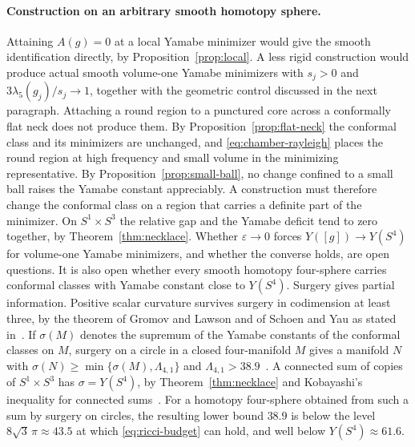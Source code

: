 \documentclass[11pt]{article}
\numberwithin{equation}{section}
\newcommand{\e}{\varepsilon}
\newcommand{\Sphere}{S^4}
\newcommand{\Y}{Y([g])}
\begin{document}
\paragraph{Construction on an arbitrary smooth homotopy sphere.}
Attaining \(A(g)=0\) at a local Yamabe minimizer would give the smooth
identification directly, by Proposition~\ref{prop:local}. A less rigid
construction would produce actual smooth volume-one Yamabe minimizers
with \(s_j>0\) and \(3\lambda_5(g_j)/s_j\to1\), together with the
geometric control discussed in the next paragraph.
Attaching a round region to a punctured core across a conformally flat
neck does not produce them. By Proposition~\ref{prop:flat-neck} the
conformal class and its minimizers are unchanged, and
\eqref{eq:chamber-rayleigh} places the round region at high frequency
and small volume in the minimizing representative. By
Proposition~\ref{prop:small-ball}, no change confined to a small ball
raises the Yamabe constant appreciably. A construction must therefore
change the conformal class on a region that carries a definite part of
the minimizer. On \(S^1\times S^3\) the relative gap and the Yamabe
deficit tend to zero together, by Theorem~\ref{thm:necklace}. Whether
\(\e\to0\) forces \(\Y\to Y(\Sphere)\) for volume-one Yamabe
minimizers, and whether the converse holds, are open questions. It is
also open whether every smooth homotopy four-sphere carries conformal
classes with Yamabe constant close to \(Y(\Sphere)\). Surgery gives
partial information. Positive scalar curvature survives surgery in
codimension at least three, by the theorem of Gromov and Lawson and of
Schoen and Yau as stated
in~\cite[Theorem~1.1]{BamlerLiMantoulidis2023Decomposing}. If
\(\sigma(M)\) denotes the supremum of the Yamabe constants of the
conformal classes on \(M\), surgery on a circle in a closed
four-manifold \(M\) gives a manifold \(N\) with
\(\sigma(N)\ge\min\{\sigma(M),\Lambda_{4,1}\}\) and
\(\Lambda_{4,1}>38.9\)~\cite[Theorem~1.2, Example~4.7]{AmmannDahlHumbert2015LowDim}.
A connected sum of copies of \(S^1\times S^3\) has
\(\sigma=Y(\Sphere)\), by Theorem~\ref{thm:necklace} and Kobayashi's
inequality for connected
sums~\cite{Kobayashi1987UnitVolume}\cite[Eq.~(14)]{LeBrun2021Scalar4}.
For a homotopy four-sphere obtained from such a sum by surgery on
circles, the resulting lower bound \(38.9\) is below the level
\(8\sqrt3\,\pi\approx43.5\) at which \eqref{eq:ricci-budget} can hold,
and well below \(Y(\Sphere)\approx61.6\).
\end{document}
